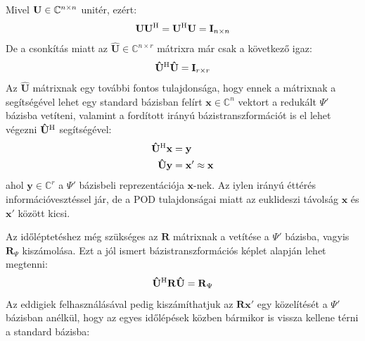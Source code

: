             \par
            Mivel ${\bf U} \in \mathbb{C}^{n \times n}$ unitér, ezért:
            \begin{equation}
                \begin{aligned}
                    \mathbf{U}\mathbf{U}^{\mathrm{H}} = \mathbf{U}^{\mathrm{H}}\mathbf{U} = \mathbf{I}_{n\times n}
                \end{aligned}
            \end{equation}
            De a csonkítás miatt az $\mathbf{\hat{U}} \in \mathbb{C}^{n \times r}$ mátrixra már csak a következő igaz:
            \begin{equation}
                \begin{aligned}
                    \mathbf{\hat{U}}^{\mathrm{H}}\mathbf{\hat{U}} = \mathbf{I}_{r\times r}
                \end{aligned}
            \end{equation}
            Az $\mathbf{\hat{U}}$ mátrixnak egy további fontos tulajdonsága, hogy ennek a mátrixnak a segítségével lehet egy standard bázisban felírt $\mathbf{x} \in \mathbb{C}^{n}$ vektort a redukált $\Psi'$ bázisba vetíteni, valamint a fordított irányú bázistranszformációt is el lehet végezni $\mathbf{\hat{U}}^{\mathrm{H}}$ segítségével:
            \begin{equation}
                \begin{aligned}
                    \mathbf{\hat{U}}^{\mathrm{H}}\mathbf{x} &= \mathbf{y}\\
                    \mathbf{\hat{U}}\mathbf{y} &= \mathbf{x'} \approx \mathbf{x}
                \end{aligned}
            \end{equation}
            ahol $\mathbf{y} \in \mathbb{C}^{r}$ a $\Psi'$ bázisbeli reprezentációja $\mathbf{x}$-nek. Az iylen irányú éttérés információvesztéssel jár, de a POD tulajdonságai miatt az euklideszi távolság $\mathbf{x}$ és $\mathbf{x'}$ között kicsi.
            \par
            Az időléptetéshez még szükséges az $\mathbf{R}$ mátrixnak a vetítése a $\Psi'$ bázisba, vagyis $\mathbf{R}_{\Psi}$ kiszámolása. Ezt a jól ismert bázistranszformációs képlet alapján lehet megtenni:
            \begin{equation}
                \mathbf{\hat{U}}^{\mathrm{H}}\mathbf{R}\mathbf{\hat{U}} = \mathbf{R}_{\Psi}
            \end{equation}
            Az eddigiek felhasználásával pedig kiszámíthatjuk az $\mathbf{R}\mathbf{x'}$ egy közelítését a $\Psi'$ bázisban anélkül, hogy az egyes időlépések közben bármikor is vissza kellene térni a standard bázisba:

